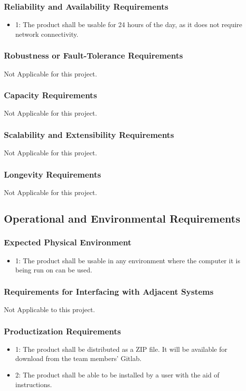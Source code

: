 \documentclass[12pt]{article}
\begin{document}
\subsubsection*{Reliability and Availability Requirements}
\begin{itemize}
\item 1: The product shall be usable for 24 hours of the day, as it does not require network connectivity.
\end{itemize}

\subsubsection*{Robustness or Fault-Tolerance Requirements}
Not Applicable for this project.
\subsubsection*{Capacity Requirements}
Not Applicable for this project.
\subsubsection*{Scalability and Extensibility Requirements}
Not Applicable for this project.
\subsubsection*{Longevity Requirements}
Not Applicable for this project.

\subsection{Operational and Environmental Requirements}

\subsubsection*{Expected Physical Environment}
\begin{itemize}
\item 1: The product shall be usable in any environment where the computer it is being run on can be used.
\end{itemize}

\subsubsection*{Requirements for Interfacing with Adjacent Systems}
Not Applicable to this project.

\subsubsection*{Productization Requirements}
\begin{itemize}
\item 1: The product shall be distributed as a ZIP file. It will be available for download from the team members' Gitlab.
\item 2: The product shall be able to be installed by a user with the aid of instructions.
\end{itemize}
\end{document}
